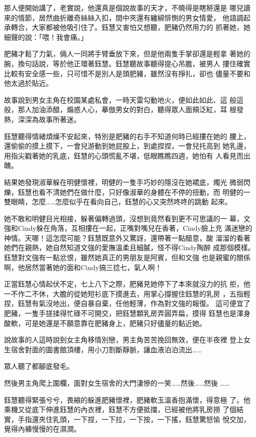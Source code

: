 那人便開始講了，老實說，他還真是個說故事的天才，不曉得是瞎掰還是
哪兒讀來的情節，居然曲折離奇絲絲入扣，間中夾還有纏綿悱惻的男女情愛，
他語調起承轉合，大家都被他吸引住了。鈺慧又害怕又想聽，肥豬仍然用力的
抓著她，她細聲的說：「喂！我會痛。」

肥豬才鬆了力氣，倆人一同將手臂垂放下來，但是他兩隻手掌卻還是輕拿
著她的腕，換句話說，等於他正環著鈺慧。鈺慧聽故事聽得提心吊膽，被男人
摟住確實比較有安全感一些，只可惜不是別人是頭肥豬，雖然沒有掙扎，卻也
儘量不要和他太過於貼近。

故事說到男女主角在校園某處私會，一時天雷勾動地火，便如此如此、這
般這般，那人加油添醋，煽惑人心，摹倣男女的對白，聽得眾人面頰泛紅，耳
根發熱，深深為故事所著迷。

鈺慧聽得情緒煩燥不安起來，特別是肥豬的右手不知道何時已經摟在她的
腰上，還偷偷的摸上摸下，一會兒游動到她屁股上，到處捏捏，一會兒托高到
她乳邊，用指尖戳著她的乳底，鈺慧的心頭慌亂不堪，低眼瞧瞧四週，她怕有
人看見而出醜。

結果她發現淑華躲在明健懷裡，明健的一隻手巧妙的隱沒在她裙底，燭光
微弱閃爍，鈺慧也看不清她們在做什麼，只好像淑華的身體在不停的扭動，而
明健的一雙眼睛，怎麼……怎麼似乎在看向自己，鈺慧的心又突然咚咚的跳動
起來。

她不敢和明健目光相接，躲著偏轉過頭，沒想到竟然看到更不可思議的一
幕，文強和Cindy躲在角落，互相摟在一起，正嘴對嘴兒在香著，Cindy臉上充
滿迷戀的神情。天哪！這怎麼可能？鈺慧既意外又驚訝，還帶著一點醋意，酸
溜溜的看著她們在親熱，她自然知道文強的愛撫溫柔且細膩，怪不得Cindy陶醉
成那個模樣。鈺慧對文強有一點忿恨，雖然她真正的男朋友是阿賓，但和文強
也是親蜜的關係啊，他居然當著她的面和Cindy搞三捻七，氣人啊！

正當鈺慧心情起伏不定，七上八下之際，肥豬見她停下了本來就沒力的抗
拒，他一不作二不休，大膽的從她短衫底下摸進去，用掌心撐握住鈺慧的乳房
，五指輕捏，鈺慧有氣沒地出，便自暴自棄，任他輕薄，作為對文強的報復。
這可便宜了肥豬，一隻手搓揉得忙碌不可開交，把鈺慧顆乳房弄圓弄扁，摸得
鈺慧也是渾身酸軟，可是她還是不願意靠在肥豬身上，肥豬只好儘量的黏近她。

說故事的人這時說到女主角移情別戀，男主角苦苦挽回無效，便在半夜裡
登上女生宿舍對面的圖書館頂樓，用小刀割斷靜脈，讓血液泊泊流出……

眾人聽了都腳底發毛。

然後男主角爬上圍欄，面對女生宿舍的大門淒慘的一笑……然後……然後
……

鈺慧聽得緊張兮兮，畏縮的躲進肥豬懷裡，肥豬軟玉溫香抱滿懷，得意極
了。他乘機又從底下伸進鈺慧的內衣裡，鈺慧不方便抵擋，已經被他將乳房撈
了個結實，手指還夾住乳頭，一下捏，一下拉，一下按，一下搖，鈺慧驚怒愉
悅交加，覺得內褲慢慢的在濕潤。

